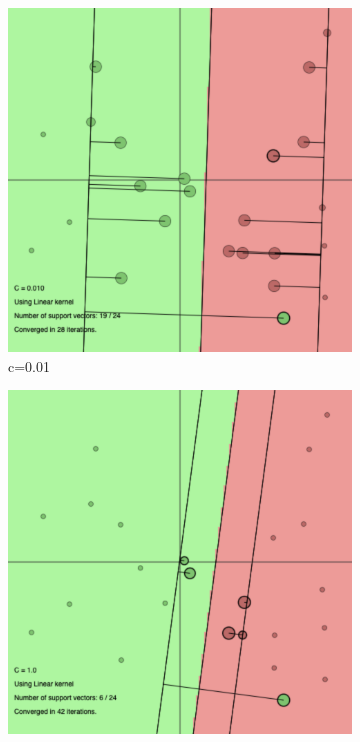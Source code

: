 \documentclass[a4paper, 11pt, one column]{article}
\begin{document}
\begin{figure}[]
    \begin{subfigure}{0.33\linewidth}
        \includegraphics[width=\linewidth]{images/lin_c_001.png}
        \caption{c=0.01}
    \end{subfigure}
    \begin{subfigure}{0.33\linewidth}
        \includegraphics[width=\linewidth]{images/lin_c_1.png}

\end{subfigure}
\end{figure}
\end{document}
